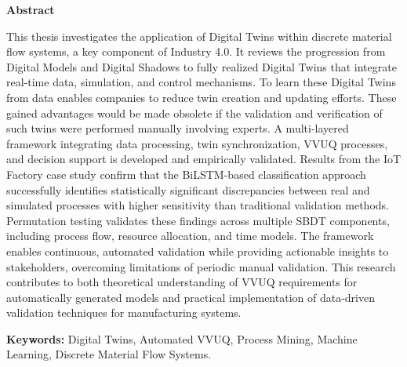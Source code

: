 \thispagestyle{plain} %

\vspace*{1.5in} %

\begin{center}
  {\Large \textbf{Abstract}}
\end{center}

This thesis investigates the application of Digital Twins within discrete material flow systems, a key component of Industry 4.0. It reviews the progression from Digital Models and Digital Shadows to fully realized Digital Twins that integrate real-time data, simulation, and control mechanisms. To learn these Digital Twins from data enables companies to reduce twin creation and updating efforts. These gained advantages would be made obsolete if the validation and verification of such twins were performed manually involving experts. A multi-layered framework integrating data processing, twin synchronization, VVUQ processes, and decision support is developed and empirically validated. Results from the IoT Factory case study confirm that the BiLSTM-based classification approach successfully identifies statistically significant discrepancies between real and simulated processes with higher sensitivity than traditional validation methods. Permutation testing validates these findings across multiple SBDT components, including process flow, resource allocation, and time models. The framework enables continuous, automated validation while providing actionable insights to stakeholders, overcoming limitations of periodic manual validation. This research contributes to both theoretical understanding of VVUQ requirements for automatically generated models and practical implementation of data-driven validation techniques for manufacturing systems.

\medskip

\textbf{Keywords:} Digital Twins, Automated VVUQ, Process Mining, Machine Learning, Discrete Material Flow Systems.

\clearpage